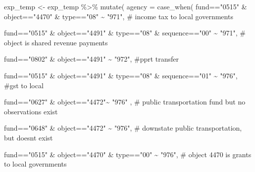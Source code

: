 \documentclass[
  letterpaper,
  DIV=11,
  numbers=noendperiod]{scrreport}
\newenvironment{Shaded}{\begin{snugshade}}{\end{snugshade}}
\newcommand{\AttributeTok}[1]{\textcolor[rgb]{0.40,0.45,0.13}{#1}}
\newcommand{\CommentTok}[1]{\textcolor[rgb]{0.37,0.37,0.37}{#1}}
\newcommand{\FunctionTok}[1]{\textcolor[rgb]{0.28,0.35,0.67}{#1}}
\newcommand{\NormalTok}[1]{\textcolor[rgb]{0.00,0.23,0.31}{#1}}
\newcommand{\OtherTok}[1]{\textcolor[rgb]{0.00,0.23,0.31}{#1}}
\newcommand{\SpecialCharTok}[1]{\textcolor[rgb]{0.37,0.37,0.37}{#1}}
\newcommand{\StringTok}[1]{\textcolor[rgb]{0.13,0.47,0.30}{#1}}
\begin{document}
\begin{Shaded}
\begin{Highlighting}[]
\NormalTok{exp\_temp }\OtherTok{\textless{}{-}}\NormalTok{ exp\_temp }\SpecialCharTok{\%\textgreater{}\%} 
  \FunctionTok{mutate}\NormalTok{(}
    \AttributeTok{agency =} \FunctionTok{case\_when}\NormalTok{(}
\NormalTok{      fund}\SpecialCharTok{==}\StringTok{"0515"} \SpecialCharTok{\&}\NormalTok{ object}\SpecialCharTok{==}\StringTok{"4470"} \SpecialCharTok{\&}\NormalTok{ type}\SpecialCharTok{==}\StringTok{"08"} \SpecialCharTok{\textasciitilde{}} \StringTok{"971"}\NormalTok{, }\CommentTok{\# income tax to local governments}
      
\NormalTok{      fund}\SpecialCharTok{==}\StringTok{"0515"} \SpecialCharTok{\&}\NormalTok{ object}\SpecialCharTok{==}\StringTok{"4491"} \SpecialCharTok{\&}\NormalTok{ type}\SpecialCharTok{==}\StringTok{"08"} \SpecialCharTok{\&}\NormalTok{ sequence}\SpecialCharTok{==}\StringTok{"00"} \SpecialCharTok{\textasciitilde{}} \StringTok{"971"}\NormalTok{, }\CommentTok{\# object is shared revenue payments}
      
\NormalTok{      fund}\SpecialCharTok{==}\StringTok{"0802"} \SpecialCharTok{\&}\NormalTok{ object}\SpecialCharTok{==}\StringTok{"4491"} \SpecialCharTok{\textasciitilde{}} \StringTok{"972"}\NormalTok{, }\CommentTok{\#pprt transfer}
      
\NormalTok{      fund}\SpecialCharTok{==}\StringTok{"0515"} \SpecialCharTok{\&}\NormalTok{ object}\SpecialCharTok{==}\StringTok{"4491"} \SpecialCharTok{\&}\NormalTok{ type}\SpecialCharTok{==}\StringTok{"08"} \SpecialCharTok{\&}\NormalTok{ sequence}\SpecialCharTok{==}\StringTok{"01"} \SpecialCharTok{\textasciitilde{}} \StringTok{"976"}\NormalTok{, }\CommentTok{\#gst to local}
      
\NormalTok{      fund}\SpecialCharTok{==}\StringTok{"0627"} \SpecialCharTok{\&}\NormalTok{ object}\SpecialCharTok{==}\StringTok{"4472"}\SpecialCharTok{\textasciitilde{}} \StringTok{"976"}\NormalTok{ , }\CommentTok{\# public transportation fund but no observations exist}
      
\NormalTok{      fund}\SpecialCharTok{==}\StringTok{"0648"} \SpecialCharTok{\&}\NormalTok{ object}\SpecialCharTok{==}\StringTok{"4472"} \SpecialCharTok{\textasciitilde{}} \StringTok{"976"}\NormalTok{, }\CommentTok{\# downstate public transportation, but doesn\textquotesingle{}t exist}
      
\NormalTok{      fund}\SpecialCharTok{==}\StringTok{"0515"} \SpecialCharTok{\&}\NormalTok{ object}\SpecialCharTok{==}\StringTok{"4470"} \SpecialCharTok{\&}\NormalTok{ type}\SpecialCharTok{==}\StringTok{"00"} \SpecialCharTok{\textasciitilde{}} \StringTok{"976"}\NormalTok{, }\CommentTok{\# object 4470 is grants to local governments}
      

\end{Highlighting}
\end{Shaded}
\end{document}
